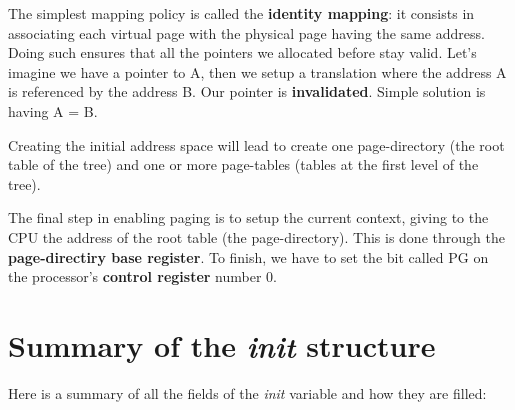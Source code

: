 The simplest mapping policy is called the \textbf{identity mapping}:
it consists in associating each virtual page with the physical page
having the same address. Doing such ensures that all the pointers we
allocated before stay valid. Let's imagine we have a pointer to A,
then we setup a translation where the address A is referenced by the
address B. Our pointer is \textbf{invalidated}. Simple solution is
having A = B.

Creating the initial address space will lead to create one
page-directory (the root table of the tree) and one or more
page-tables (tables at the first level of the tree).

The final step in enabling paging is to setup the current context,
giving to the CPU the address of the root table (the
page-directory). This is done through the \textbf{page-directiry base
register}. To finish, we have to set the bit called PG on the
processor's \textbf{control register} number 0.

%
%

\section{Summary of the \textit{init} structure}

Here is a summary of all the fields of the \textit{init} variable and
how they are filled:

